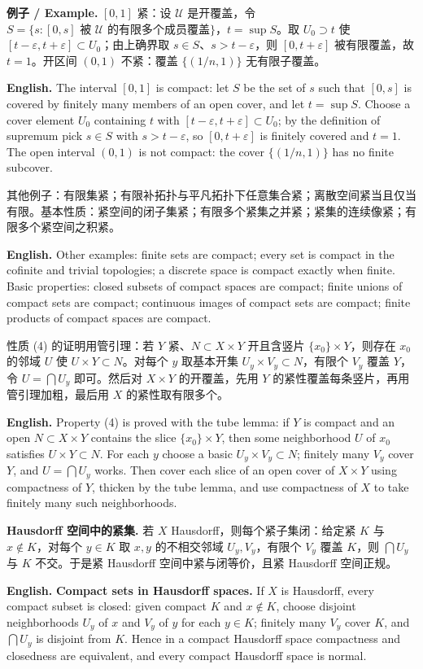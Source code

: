 \documentclass[UTF8,11pt,a4paper]{ctexart}
\newcommand{\EN}[1]{\par\noindent\textbf{English.} #1\par}
\newcommand{\EX}[2]{\par\noindent\textbf{例子 / Example.} #1\par\EN{#2}}
\begin{document}
\EX{$[0,1]$ 紧：设 $\mathcal U$ 是开覆盖，令 $S=\{s:[0,s]\text{ 被 } \mathcal U\text{ 的有限多个成员覆盖}\}$，$t=\sup S$。取 $U_0\supset t$ 使 $[t-\varepsilon,t+\varepsilon]\subset U_0$；由上确界取 $s\in S$、$s>t-\varepsilon$，则 $[0,t+\varepsilon]$ 被有限覆盖，故 $t=1$。开区间 $(0,1)$ 不紧：覆盖 $\{(1/n,1)\}$ 无有限子覆盖。}{The interval $[0,1]$ is compact: let $S$ be the set of $s$ such that $[0,s]$ is covered by finitely many members of an open cover, and let $t=\sup S$. Choose a cover element $U_0$ containing $t$ with $[t-\varepsilon,t+\varepsilon]\subset U_0$; by the definition of supremum pick $s\in S$ with $s>t-\varepsilon$, so $[0,t+\varepsilon]$ is finitely covered and $t=1$. The open interval $(0,1)$ is not compact: the cover $\{(1/n,1)\}$ has no finite subcover.}

\noindent 其他例子：有限集紧；有限补拓扑与平凡拓扑下任意集合紧；离散空间紧当且仅当有限。基本性质：紧空间的闭子集紧；有限多个紧集之并紧；紧集的连续像紧；有限多个紧空间之积紧。
\EN{Other examples: finite sets are compact; every set is compact in the cofinite and trivial topologies; a discrete space is compact exactly when finite. Basic properties: closed subsets of compact spaces are compact; finite unions of compact sets are compact; continuous images of compact sets are compact; finite products of compact spaces are compact.}

\noindent 性质 (4) 的证明用管引理：若 $Y$ 紧、$N\subset X\times Y$ 开且含竖片 $\{x_0\}\times Y$，则存在 $x_0$ 的邻域 $U$ 使 $U\times Y\subset N$。对每个 $y$ 取基本开集 $U_y\times V_y\subset N$，有限个 $V_y$ 覆盖 $Y$，令 $U=\bigcap U_y$ 即可。然后对 $X\times Y$ 的开覆盖，先用 $Y$ 的紧性覆盖每条竖片，再用管引理加粗，最后用 $X$ 的紧性取有限多个。
\EN{Property (4) is proved with the tube lemma: if $Y$ is compact and an open $N\subset X\times Y$ contains the slice $\{x_0\}\times Y$, then some neighborhood $U$ of $x_0$ satisfies $U\times Y\subset N$. For each $y$ choose a basic $U_y\times V_y\subset N$; finitely many $V_y$ cover $Y$, and $U=\bigcap U_y$ works. Then cover each slice of an open cover of $X\times Y$ using compactness of $Y$, thicken by the tube lemma, and use compactness of $X$ to take finitely many such neighborhoods.}

\noindent\textbf{Hausdorff 空间中的紧集.} 若 $X$ Hausdorff，则每个紧子集闭：给定紧 $K$ 与 $x\notin K$，对每个 $y\in K$ 取 $x,y$ 的不相交邻域 $U_y,V_y$，有限个 $V_y$ 覆盖 $K$，则 $\bigcap U_y$ 与 $K$ 不交。于是紧 Hausdorff 空间中紧与闭等价，且紧 Hausdorff 空间正规。
\EN{\textbf{Compact sets in Hausdorff spaces.} If $X$ is Hausdorff, every compact subset is closed: given compact $K$ and $x\notin K$, choose disjoint neighborhoods $U_y$ of $x$ and $V_y$ of $y$ for each $y\in K$; finitely many $V_y$ cover $K$, and $\bigcap U_y$ is disjoint from $K$. Hence in a compact Hausdorff space compactness and closedness are equivalent, and every compact Hausdorff space is normal.}
\end{document}
